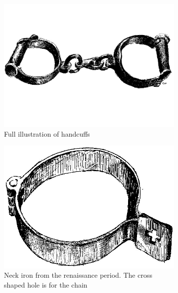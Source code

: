 \begin{figure}[h!]
    \centering
    \begin{subfigure}[h!]{0.3\textwidth}
        \includegraphics[width=\textwidth]{figures/chains0.jpg}
        \caption{Full illustration of handcuffs}\label{fig:chains0}
    \end{subfigure}
    \hfill
    \begin{subfigure}[h!]{0.3\textwidth}
        \includegraphics[width=\textwidth]{figures/chains1.jpg}
        \caption{Neck iron from the renaissance period. The cross shaped hole is for the chain}\label{fig:chains1}
    \end{subfigure}
    \hfill
    \begin{subfigure}[h!]{0.3\textwidth}

\end{subfigure}
\end{figure}

